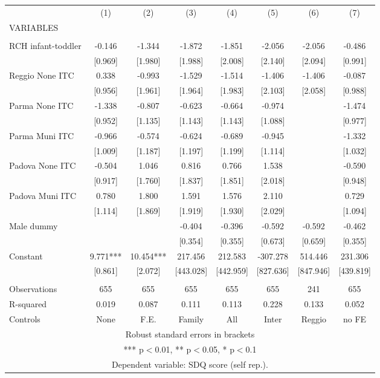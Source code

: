 \begin{tabular}{lccccccc} \hline
 & (1) & (2) & (3) & (4) & (5) & (6) & (7) \\
VARIABLES &  &  &  &  &  &  &  \\ \hline
 &  &  &  &  &  &  &  \\
RCH infant-toddler & -0.146 & -1.344 & -1.872 & -1.851 & -2.056 & -2.056 & -0.486 \\
 & [0.969] & [1.980] & [1.988] & [2.008] & [2.140] & [2.094] & [0.991] \\
Reggio None ITC & 0.338 & -0.993 & -1.529 & -1.514 & -1.406 & -1.406 & -0.087 \\
 & [0.956] & [1.961] & [1.964] & [1.983] & [2.103] & [2.058] & [0.988] \\
Parma None ITC & -1.338 & -0.807 & -0.623 & -0.664 & -0.974 &  & -1.474 \\
 & [0.952] & [1.135] & [1.143] & [1.143] & [1.088] &  & [0.977] \\
Parma Muni ITC & -0.966 & -0.574 & -0.624 & -0.689 & -0.945 &  & -1.332 \\
 & [1.009] & [1.187] & [1.197] & [1.199] & [1.114] &  & [1.032] \\
Padova None ITC & -0.504 & 1.046 & 0.816 & 0.766 & 1.538 &  & -0.590 \\
 & [0.917] & [1.760] & [1.837] & [1.851] & [2.018] &  & [0.948] \\
Padova Muni ITC & 0.780 & 1.800 & 1.591 & 1.576 & 2.110 &  & 0.729 \\
 & [1.114] & [1.869] & [1.919] & [1.930] & [2.029] &  & [1.094] \\
Male dummy &  &  & -0.404 & -0.396 & -0.592 & -0.592 & -0.462 \\
 &  &  & [0.354] & [0.355] & [0.673] & [0.659] & [0.355] \\
Constant & 9.771*** & 10.454*** & 217.456 & 212.583 & -307.278 & 514.446 & 231.306 \\
 & [0.861] & [2.072] & [443.028] & [442.959] & [827.636] & [847.946] & [439.819] \\
 &  &  &  &  &  &  &  \\
Observations & 655 & 655 & 655 & 655 & 655 & 241 & 655 \\
R-squared & 0.019 & 0.087 & 0.111 & 0.113 & 0.228 & 0.133 & 0.052 \\
 Controls & None & F.E. & Family & All & Inter & Reggio & no FE \\ \hline
\multicolumn{8}{c}{ Robust standard errors in brackets} \\
\multicolumn{8}{c}{ *** p$<$0.01, ** p$<$0.05, * p$<$0.1} \\
\multicolumn{8}{c}{ Dependent variable: SDQ score (self rep.).} \\
\end{tabular}
